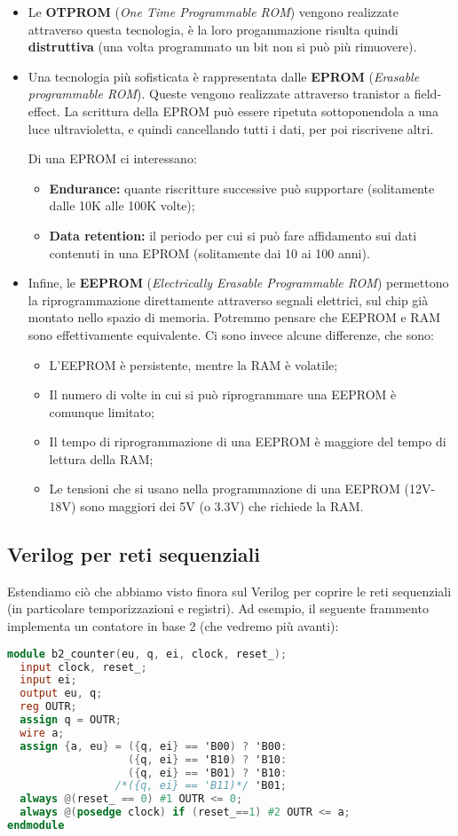 \documentclass[a4paper,11pt]{article}
\begin{document}
\begin{itemize}
	\item Le \textbf{OTPROM} (\textit{One Time Programmable ROM}) vengono realizzate attraverso questa tecnologia, è la loro progammazione risulta quindi \textbf{distruttiva} (una volta programmato un bit non si può più rimuovere).
	\item  Una tecnologia più sofisticata è rappresentata dalle \textbf{EPROM} (\textit{Erasable programmable ROM}).
Queste vengono realizzate attraverso tranistor a field-effect.
La scrittura della EPROM può essere ripetuta sottoponendola a una luce ultravioletta, e quindi cancellando tutti i dati, per poi riscrivene altri.

Di una EPROM ci interessano:
\begin{itemize}
	\item \textbf{Endurance:} quante riscritture successive può supportare (solitamente dalle 10K alle 100K volte);
	\item \textbf{Data retention:} il periodo per cui si può fare affidamento sui dati contenuti in una EPROM (solitamente dai 10 ai 100 anni).
\end{itemize}
	\item Infine, le \textbf{EEPROM} (\textit{Electrically Erasable Programmable ROM}) permettono la riprogrammazione direttamente attraverso segnali elettrici, sul chip già montato nello spazio di memoria.
		Potremmo pensare che EEPROM e RAM sono effettivamente equivalente.
		Ci sono invece alcune differenze, che sono:
		\begin{itemize}
			\item L'EEPROM è persistente, mentre la RAM è volatile;
			\item Il numero di volte in cui si può riprogrammare una EEPROM è comunque limitato;
			\item Il tempo di riprogrammazione di una EEPROM è maggiore del tempo di lettura della RAM;
			\item Le tensioni che si usano nella programmazione di una EEPROM (12V-18V) sono maggiori dei 5V (o 3.3V) che richiede la RAM. 
		\end{itemize}
\end{itemize}

\subsection{Verilog per reti sequenziali}
Estendiamo ciò che abbiamo visto finora sul Verilog per coprire le reti sequenziali (in particolare temporizzazioni e registri). 
Ad esempio, il seguente frammento implementa un contatore in base 2 (che vedremo più avanti):
\begin{lstlisting}[language=verilog, style=codestyle]	
module b2_counter(eu, q, ei, clock, reset_);
  input clock, reset_;
  input ei;
  output eu, q;
  reg OUTR;
  assign q = OUTR;	
  wire a;
  assign {a, eu} = ({q, ei} == 'B00) ? 'B00:
                   ({q, ei} == 'B10) ? 'B10:
                   ({q, ei} == 'B01) ? 'B10:
                 /*({q, ei} == 'B11)*/ 'B01;
  always @(reset_ == 0) #1 OUTR <= 0;
  always @(posedge clock) if (reset_==1) #2 OUTR <= a;
endmodule
\end{lstlisting}
\end{document}

